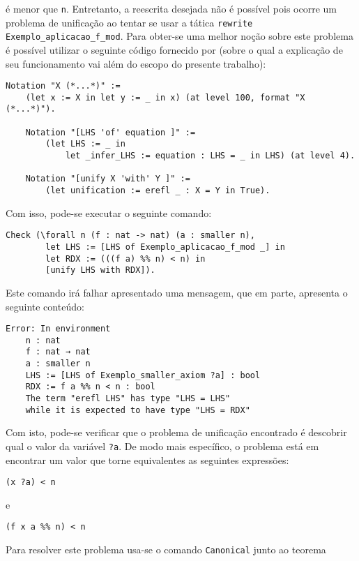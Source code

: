 é menor que \lstinline[language = coq]!n!. Entretanto, a reescrita desejada não é possível pois ocorre um problema de unificação ao tentar se usar a tática \lstinline[language = coq]!rewrite Exemplo_aplicacao_f_mod!. Para obter-se uma melhor noção sobre este problema é possível utilizar o seguinte código fornecido por \cite{assia_mahboubi_2022_7118596} (sobre o qual a explicação de seu funcionamento vai além do escopo do presente trabalho):
\begin{lstlisting}[language = coq]
    Notation "X (*...*)" :=
    (let x := X in let y := _ in x) (at level 100, format "X  (*...*)").

    Notation "[LHS 'of' equation ]" := 
        (let LHS := _ in 
            let _infer_LHS := equation : LHS = _ in LHS) (at level 4).

    Notation "[unify X 'with' Y ]" := 
        (let unification := erefl _ : X = Y in True).
\end{lstlisting} 
Com isso, pode-se executar o seguinte comando:
\begin{lstlisting}[language = coq]
    Check (\forall n (f : nat -> nat) (a : smaller n),
        let LHS := [LHS of Exemplo_aplicacao_f_mod _] in
        let RDX := (((f a) %% n) < n) in
        [unify LHS with RDX]).
\end{lstlisting}
Este comando irá falhar apresentado uma mensagem, que em parte, apresenta o seguinte conteúdo:
\begin{lstlisting}[language = coq-error]
    Error: In environment
    n : nat
    f : nat → nat
    a : smaller n
    LHS := [LHS of Exemplo_smaller_axiom ?a] : bool
    RDX := f a %% n < n : bool
    The term "erefl LHS" has type "LHS = LHS"
    while it is expected to have type "LHS = RDX"
\end{lstlisting} 
Com isto, pode-se verificar que o problema de unificação encontrado é descobrir qual o valor da variável \lstinline[language = coq]!?a!. De modo mais específico, o problema está em encontrar um valor que torne equivalentes as seguintes expressões:
\begin{lstlisting}[language = coq]
    (x ?a) < n
\end{lstlisting} 
e
\begin{lstlisting}[language = coq]
    (f x a %% n) < n
\end{lstlisting}
 Para resolver este problema %
 usa-se o comando \lstinline[language = coq]!Canonical! junto ao teorema\\ 
